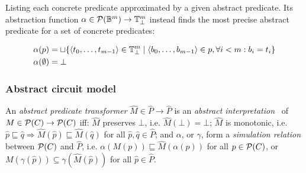 \noindent Listing each concrete predicate approximated by a given abstract predicate. Its abstraction function $\alpha \in \mathcal{P}(\mathbb{B}^{m}) \rightarrow \mathbb{T}_{\bot}^{m}$ instead finds the most precise abstract predicate for a set of concrete predicates:

\begin{align*}
\alpha ( p ) &= \operatorname{\sqcup} \{ \langle t_{0}, \ldots, t_{m-1} \rangle \in \mathbb{T}_{\bot}^{m} \mid \langle b_{0}, \ldots, b_{m-1} \rangle \in p, \forall i < m : b_{i} = t_{i} \} \\
\alpha ( \emptyset ) &= \bot
\end{align*}



\subsubsection{Abstract circuit model}

An \textit{abstract predicate transformer} $\hat M \in \hat P \rightarrow \hat P$ is an \textit{abstract interpretation}~\cite{cousot1996} of $M \in \mathcal{P}(C) \rightarrow \mathcal{P}(C)$ iff: $\hat M$ preserves $\bot$, i.e. $\hat M(\bot) = \bot$; $\hat M$ is monotonic, i.e. $\hat p \sqsubseteq \hat q \Rightarrow \hat M (\hat p) \sqsubseteq \hat M (\hat q)$ for all $\hat p, \hat q \in \hat P$; and $\alpha$, or $\gamma$, form a \textit{simulation relation} between $\mathcal{P}(C)$ and $\hat P$, i.e. $\alpha(M(p)) \sqsubseteq \hat M(\alpha(p))$ for all $p \in \mathcal{P}(C)$, or $M(\gamma(\hat p)) \subseteq \gamma(\hat M(\hat p))$ for all $\hat p \in \hat P$.




